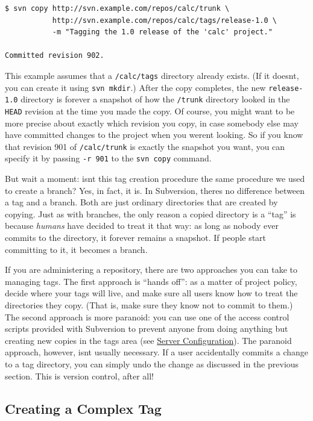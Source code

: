 \begin{verbatim}
$ svn copy http://svn.example.com/repos/calc/trunk \
           http://svn.example.com/repos/calc/tags/release-1.0 \
           -m "Tagging the 1.0 release of the 'calc' project."

Committed revision 902.
\end{verbatim}

This example assumes that a \texttt{/calc/tags} directory already
exists. (If it doesn\textquotesingle t, you can create it using
\texttt{svn\ mkdir}.) After the copy completes, the new
\texttt{release-1.0} directory is forever a snapshot of how the
\texttt{/trunk} directory looked in the \texttt{HEAD} revision at the
time you made the copy. Of course, you might want to be more precise
about exactly which revision you copy, in case somebody else may have
committed changes to the project when you weren\textquotesingle t
looking. So if you know that revision 901 of \texttt{/calc/trunk} is
exactly the snapshot you want, you can specify it by passing
\texttt{-r\ 901} to the \texttt{svn\ copy} command.

But wait a moment: isn\textquotesingle t this tag creation procedure the
same procedure we used to create a branch? Yes, in fact, it is. In
Subversion, there\textquotesingle s no difference between a tag and a
branch. Both are just ordinary directories that are created by copying.
Just as with branches, the only reason a copied directory is a ``tag''
is because \emph{humans} have decided to treat it that way: as long as
nobody ever commits to the directory, it forever remains a snapshot. If
people start committing to it, it becomes a branch.

If you are administering a repository, there are two approaches you can
take to managing tags. The first approach is ``hands off'': as a matter
of project policy, decide where your tags will live, and make sure all
users know how to treat the directories they copy. (That is, make sure
they know not to commit to them.) The second approach is more paranoid:
you can use one of the access control scripts provided with Subversion
to prevent anyone from doing anything but creating new copies in the
tags area (see \hyperref[svn.serverconfig]{Server Configuration}). The
paranoid approach, however, isn\textquotesingle t usually necessary. If
a user accidentally commits a change to a tag directory, you can simply
undo the change as discussed in the previous section. This is version
control, after all!

\subsection{Creating a Complex
Tag}\label{svn.branchmerge.tags.mkcomplex}

